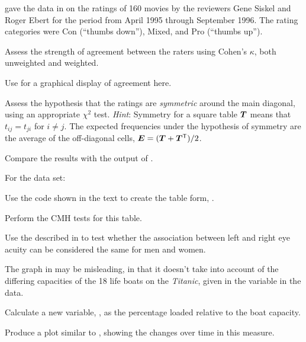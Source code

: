 \documentclass[11pt]{report}\usepackage[]{graphicx}\usepackage[]{color}
\begin{document}
\begin{Exercises}
  \exercise \citet{AgrestiWinner:1997} gave the data in  on the
  ratings of 160 movies by the reviewers Gene Siskel and Roger Ebert for the period
  from April 1995 through September 1996. The rating categories were Con (``thumbs down''),
  Mixed, and Pro (``thumbs up'').
  
  \begin{enumerate*}
     \item Assess the strength of agreement between the raters using Cohen's
       $\kappa$, both unweighted and weighted.
     \item Use  for a graphical display of agreement here.
     \item Assess the hypothesis that the ratings are \emph{symmetric} around the
       main diagonal, using an appropriate $\chi^2$ test.
       \emph{Hint}:  Symmetry for a square table $\bm{T}$ means that $t_{ij} = t_{ji}$
       for $i \ne j$.  The expected frequencies under the hypothesis of symmetry
       are the average of the off-diagonal cells,
       $\bm{E} = (\bm{T} + \bm{T}^\mathsf{T}) / 2$.
     \item Compare the results with the output of .
     \end{enumerate*}

  \exercise For the  data set:
    \begin{enumerate*}
      \item Use the code shown in the text to create the table form, .
      \item Perform the CMH tests for this table.
      \item Use the  described in  to
      test whether the association between left and right eye acuity can be
      considered the same for men and women.
    \end{enumerate*}

  \exercise The graph in  may be misleading, in that it doesn't
  take into account of the differing capacities of the 18 life boats on the
  \emph{Titanic}, given in the variable  in the  data.
    \begin{enumerate*}
      \item Calculate a new variable, , as the percentage
      loaded relative to the boat capacity.
      \item Produce a plot similar to , showing the
      changes over time in this measure.
    \end{enumerate*}

\end{Exercises}
\end{document}
